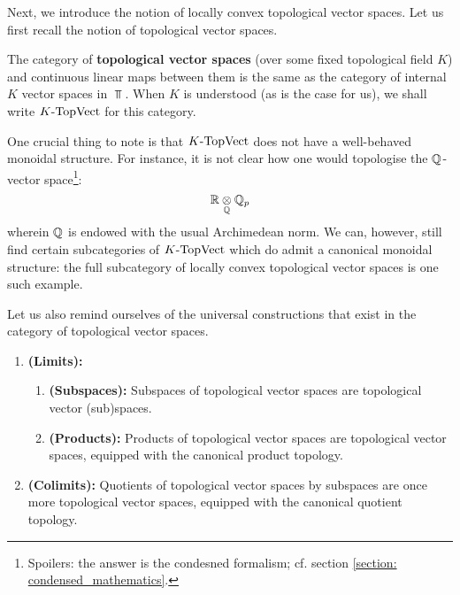             Next, we introduce the notion of locally convex topological vector spaces. Let us first recall the notion of topological vector spaces.
            \begin{definition} \label{def: topological_vector_spaces}
                The category of \textbf{topological vector spaces} (over some fixed topological field $K$) and continuous linear maps between them is the same as the category of internal $K$ vector spaces in $\Top$. When $K$ is understood (as is the case for us), we shall write $K\text{-}\mathrm{Top}\mathrm{Vect}$ for this category. 
            \end{definition}
            \begin{remark}
                One crucial thing to note is that $K\text{-}\mathrm{Top}\mathrm{Vect}$ does not have a well-behaved monoidal structure. For instance, it is not clear how one would topologise the $\mathbb{Q}$-vector space\footnote{Spoilers: the answer is the condesned formalism; cf. section \ref{section: condensed_mathematics}.}:
                    $$\R \tensor_{\Q} \Q_p$$
                wherein $\mathbb{Q}$ is endowed with the usual Archimedean norm. We can, however, still find certain subcategories of $K\text{-}\mathrm{Top}\mathrm{Vect}$ which do admit a canonical monoidal structure: the full subcategory of locally convex topological vector spaces is one such example. 
            \end{remark}
            Let us also remind ourselves of the universal constructions that exist in the category of topological vector spaces.
            \begin{proposition} \label{prop: (co)limits_of_topological_vector_spaces}
                \noindent
                \begin{enumerate}
                    \item \textbf{(Limits):} 
                        \begin{enumerate}
                            \item \textbf{(Subspaces):} Subspaces of topological vector spaces are topological vector (sub)spaces. 
                            \item \textbf{(Products):} Products of topological vector spaces are topological vector spaces, equipped with the canonical product topology.
                        \end{enumerate}
                    \item \textbf{(Colimits):} Quotients of topological vector spaces by subspaces are once more topological vector spaces, equipped with the canonical quotient topology.
                \end{enumerate}
            \end{proposition}
